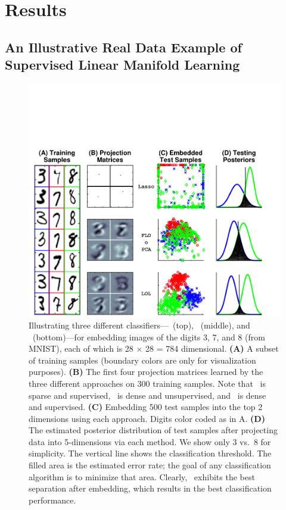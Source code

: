 \documentclass[10pt]{article}
\begin{document}
\section*{Results}

\subsection*{An Illustrative Real Data Example of Supervised Linear Manifold Learning}



\begin{figure}
\centering %
\includegraphics[width=0.7\linewidth,trim=1cm 0cm 0cm 4.0cm,clip=true]{../Figs/mnist}
\caption{
Illustrating three different classifiers---~(top), ~(middle), and \Lol~(bottom)---for embedding images of the digits 3, 7, and 8 (from MNIST), each of which is 28 $\times$ 28 = 784 dimensional.
\textbf{(A)} A subset of training samples  (boundary colors are only for visualization purposes).
\textbf{(B)} The first four projection matrices learned by the three different approaches on 300 training samples. Note that ~is sparse and supervised, \Pca~is dense and unsupervised, and \Lol~is dense and supervised.
\textbf{(C)} Embedding 500 test samples into the top 2 dimensions using each approach.  Digits color coded as in A.
\textbf{(D)}  The estimated posterior distribution of test samples after
projecting data into 5-dimensions via each method.
We show only 3 vs.~8 for simplicity.
The vertical line shows the classification threshold.
The filled area is the estimated error rate; the goal of any classification algorithm is to minimize that area.
Clearly, \Lol~exhibits the best separation after embedding, which results in the best classification performance.
}
\label{f:mnist}
\end{figure}
\end{document}
